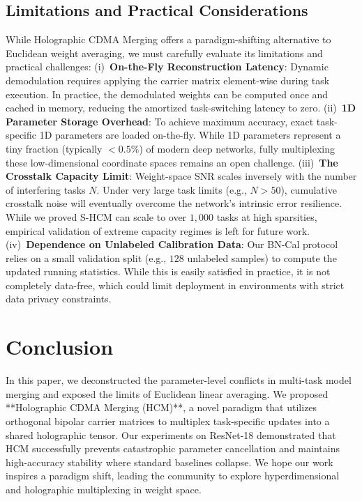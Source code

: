 \documentclass{article}
\begin{document}
\subsection{Limitations and Practical Considerations}
\label{sec:limitations}
While Holographic CDMA Merging offers a paradigm-shifting alternative to Euclidean weight averaging, we must carefully evaluate its limitations and practical challenges:
(i)~\textbf{On-the-Fly Reconstruction Latency}: Dynamic demodulation requires applying the carrier matrix element-wise during task execution. In practice, the demodulated weights can be computed once and cached in memory, reducing the amortized task-switching latency to zero.
(ii)~\textbf{1D Parameter Storage Overhead}: To achieve maximum accuracy, exact task-specific 1D parameters are loaded on-the-fly. While 1D parameters represent a tiny fraction (typically $<0.5\%$) of modern deep networks, fully multiplexing these low-dimensional coordinate spaces remains an open challenge.
(iii)~\textbf{The Crosstalk Capacity Limit}: Weight-space SNR scales inversely with the number of interfering tasks $N$. Under very large task limits (e.g., $N > 50$), cumulative crosstalk noise will eventually overcome the network's intrinsic error resilience. While we proved S-HCM can scale to over $1,000$ tasks at high sparsities, empirical validation of extreme capacity regimes is left for future work.
(iv)~\textbf{Dependence on Unlabeled Calibration Data}: Our BN-Cal protocol relies on a small validation split (e.g., $128$ unlabeled samples) to compute the updated running statistics. While this is easily satisfied in practice, it is not completely data-free, which could limit deployment in environments with strict data privacy constraints.

\section{Conclusion}
\label{sec:conclusion}
In this paper, we deconstructed the parameter-level conflicts in multi-task model merging and exposed the limits of Euclidean linear averaging. We proposed **Holographic CDMA Merging (HCM)**, a novel paradigm that utilizes orthogonal bipolar carrier matrices to multiplex task-specific updates into a shared holographic tensor. Our experiments on ResNet-18 demonstrated that HCM successfully prevents catastrophic parameter cancellation and maintains high-accuracy stability where standard baselines collapse. We hope our work inspires a paradigm shift, leading the community to explore hyperdimensional and holographic multiplexing in weight space.
\end{document}
